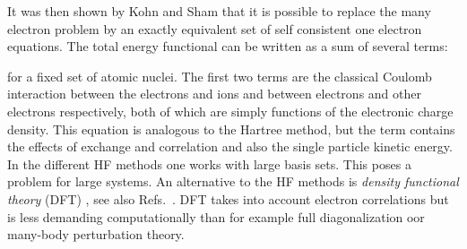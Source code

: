 It was then shown by Kohn and Sham  that it is possible to replace the many electron problem by an exactly 
equivalent set of self consistent one electron equations. The total energy functional can be written as a sum of several terms:

for a fixed set of atomic nuclei. The first two terms are the classical Coulomb interaction 
between the electrons and ions and between electrons and other electrons respectively, both 
of which are simply functions of the electronic charge density.
This equation is analogous to the Hartree method, but the term contains the effects of exchange and 
correlation and also the single particle kinetic energy.
In the different HF methods one works with large basis sets. This
poses a problem for large systems. An alternative to the HF methods is
\emph{density functional theory} (DFT) \cite{hohenbergkohn1964,kohnsham1965}, see also 
Refs.~\cite{perdew1981,perdew1992,perdew1992b,jones1989,thij}. DFT takes into 
account electron correlations but is less demanding computationally
than for example full diagonalization oor many-body perturbation theory.

